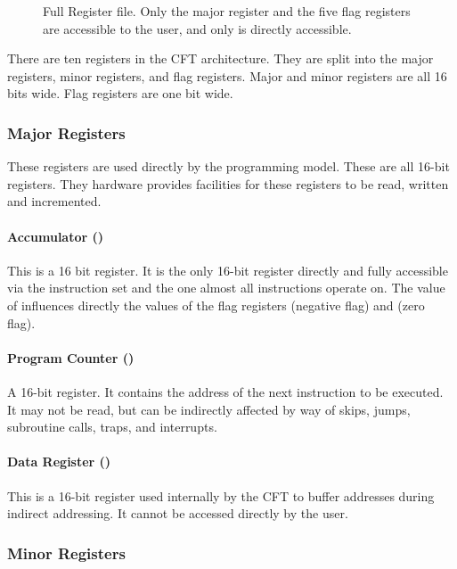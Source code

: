 \begin{figure}[tb]
  \centering
  
  \caption{\label{fig-rf}Full Register file. Only the \A{} major
    register and the five flag registers are accessible to the user,
    and only \A{} is directly accessible.}
\end{figure}

There are ten \glspl{register} in the CFT architecture. They are split into
the major registers, minor registers, and flag registers. Major and minor
registers are all 16 bits wide. Flag registers are one bit wide.

\subsubsection{Major Registers}

These registers are used directly by the programming model. These are
all 16-bit registers. They hardware provides facilities for these
registers to be read, written and incremented.

\paragraph{Accumulator (\A)}
\label{sec:accumulator}

This is a 16 bit register. It is the only 16-bit register directly and
fully accessible via the instruction set and the one almost all
instructions operate on. The value of \A{} influences directly the
values of the flag registers \Nreg (negative flag) and \Zreg (zero
flag).

\paragraph{Program Counter (\PC)}

A 16-bit register. It contains the address of the next instruction to
be executed. It may not be read, but can be indirectly affected by way
of skips, jumps, subroutine calls, traps, and interrupts.

\paragraph{Data Register (\DR)}

This is a 16-bit register used internally by the CFT to buffer
addresses during indirect addressing. It cannot be accessed directly
by the user.

\subsubsection{Minor Registers}

